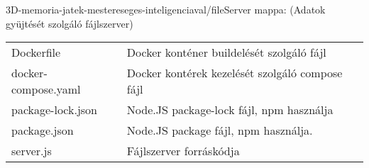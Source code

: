 \\
\\
\noindent 3D-memoria-jatek-mestereseges-inteligenciaval/fileServer mappa: (Adatok gyüjtését szolgáló fájlszerver) \\
\begin{tabular}{l l}
    \quad Dockerfile  & \quad Docker konténer buildelését szolgáló fájl \\ 
    \quad docker-compose.yaml  & \quad Docker kontérek kezelését szolgáló compose fájl \\ 
    \quad package-lock.json  & \quad Node.JS package-lock fájl, npm használja\\ 
    \quad package.json  & \quad Node.JS package fájl, npm használja. \\ 
    \quad server.js  & \quad Fájlszerver forráskódja \\ 
\end{tabular}

\newpage


